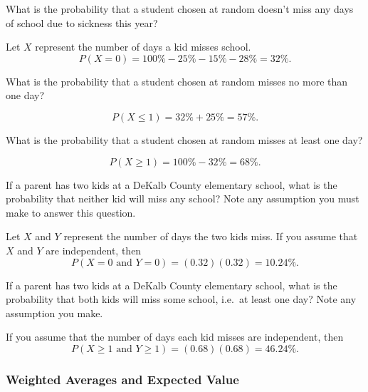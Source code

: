 \documentclass[12pt,answers]{exam}
\newcounter{countA}
\begin{document}
\begin{questions}
  \begin{parts}
  \item
    What is the probability that a student chosen at random doesn't miss
    any days of school due to sickness this year?
\begin{solution}
Let $X$ represent the number of days a kid misses school.
$$P(X = 0) = 100\% - 25\% - 15\% - 28\% = 32\%.$$
\end{solution}
\vfill
  \item
    What is the probability that a student chosen at random misses no
    more than one day?
\begin{solution}
$$P(X \le 1) = 32\% + 25\% = 57\%.$$
\end{solution}
\vfill
  \item
    What is the probability that a student chosen at random misses at
    least one day?
\begin{solution}
$$P(X \ge 1) = 100\% - 32\% = 68\%.$$
\end{solution}
  \item
    If a parent has two kids at a DeKalb County elementary school, what
    is the probability that neither kid will miss any school? Note any
    assumption you must make to answer this question.
\begin{solution}
Let $X$ and $Y$ represent the number of days the two kids miss.
If you assume that $X$ and $Y$ are independent, then 
$$P(X = 0 \text{ and } Y = 0) = (0.32) (0.32) = 10.24\%.$$
\end{solution}
\vfill
  \item
    If a parent has two kids at a DeKalb County elementary school, what
    is the probability that both kids will miss some school, i.e.~at
    least one day? Note any assumption you make.
\begin{solution}
If you assume that the number of days each kid misses are independent, then 
$$P(X \ge 1 \text{ and } Y \ge 1) = (0.68) (0.68) = 46.24\%.$$
\end{solution}
\vfill
  \end{parts}

\setcounter{countA}{\value{question}}
\end{questions}

\subsubsection*{Weighted Averages and Expected
Value}\label{weighted-averages-and-expected-value}
\end{document}
